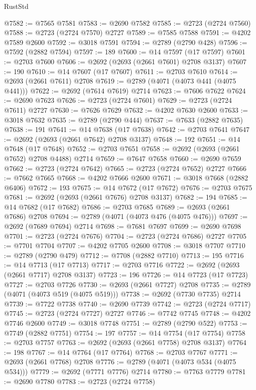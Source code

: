 \begin{lexlean}{RustStd}
\begin{coremodule}
@7582 := @7565 @7581
@7583 := @2690 @7582
@7585 := @2723 (@2724 @7560)
@7588 := @2723 (@2724 @7570) @2727
@7589 := @7585 @7588
@7591 := @4202 @7589 @2600
@7592 := @3018 @7591
@7594 := @2789 (@2790 @428)
@7596 := @7592 (@2882 @7594)
@7597 := 189
@7600 := @14 @7597 (@17 @7597)
@7601 := @2703 @7600
@7606 := @2692 (@2693 (@2661 @7601) @2708 @3137)
@7607 := 190
@7610 := @14 @7607 (@17 @7607)
@7611 := @2703 @7610
@7614 := @2693 (@2661 @7611) @2708
@7619 := @2789 (@4071 (@4073 @441 (@4075 @441)))
@7622 := @2692 (@7614 @7619) @2714
@7623 := @7606 @7622
@7624 := @2690 @7623
@7626 := @2723 (@2724 @7601)
@7629 := @2723 (@2724 @7611) @2727
@7630 := @7626 @7629
@7632 := @4202 @7630 @2600
@7633 := @3018 @7632
@7635 := @2789 (@2790 @444)
@7637 := @7633 (@2882 @7635)
@7638 := 191
@7641 := @14 @7638 (@17 @7638)
@7642 := @2703 @7641
@7647 := @2692 (@2693 (@2661 @7642) @2708 @3137)
@7648 := 192
@7651 := @14 @7648 (@17 @7648)
@7652 := @2703 @7651
@7658 := @2692 (@2693 (@2661 @7652) @2708 @4488) @2714
@7659 := @7647 @7658
@7660 := @2690 @7659
@7662 := @2723 (@2724 @7642)
@7665 := @2723 (@2724 @7652) @2727
@7666 := @7662 @7665
@7668 := @4202 @7666 @2600
@7671 := @3018 @7668 (@2882 @6406)
@7672 := 193
@7675 := @14 @7672 (@17 @7672)
@7676 := @2703 @7675
@7681 := @2692 (@2693 (@2661 @7676) @2708 @3137)
@7682 := 194
@7685 := @14 @7682 (@17 @7682)
@7686 := @2703 @7685
@7689 := @2693 (@2661 @7686) @2708
@7694 := @2789 (@4071 (@4073 @476 (@4075 @476)))
@7697 := @2692 (@7689 @7694) @2714
@7698 := @7681 @7697
@7699 := @2690 @7698
@7701 := @2723 (@2724 @7676)
@7704 := @2723 (@2724 @7686) @2727
@7705 := @7701 @7704
@7707 := @4202 @7705 @2600
@7708 := @3018 @7707
@7710 := @2789 (@2790 @479)
@7712 := @7708 (@2882 @7710)
@7713 := 195
@7716 := @14 @7713 (@17 @7713)
@7717 := @2703 @7716
@7722 := @2692 (@2693 (@2661 @7717) @2708 @3137)
@7723 := 196
@7726 := @14 @7723 (@17 @7723)
@7727 := @2703 @7726
@7730 := @2693 (@2661 @7727) @2708
@7735 := @2789 (@4071 (@4073 @519 (@4075 @519)))
@7738 := @2692 (@7730 @7735) @2714
@7739 := @7722 @7738
@7740 := @2690 @7739
@7742 := @2723 (@2724 @7717)
@7745 := @2723 (@2724 @7727) @2727
@7746 := @7742 @7745
@7748 := @4202 @7746 @2600
@7749 := @3018 @7748
@7751 := @2789 (@2790 @522)
@7753 := @7749 (@2882 @7751)
@7754 := 197
@7757 := @14 @7754 (@17 @7754)
@7758 := @2703 @7757
@7763 := @2692 (@2693 (@2661 @7758) @2708 @3137)
@7764 := 198
@7767 := @14 @7764 (@17 @7764)
@7768 := @2703 @7767
@7771 := @2693 (@2661 @7768) @2708
@7776 := @2789 (@4071 (@4073 @534 (@4075 @534)))
@7779 := @2692 (@7771 @7776) @2714
@7780 := @7763 @7779
@7781 := @2690 @7780
@7783 := @2723 (@2724 @7758)

\end{coremodule}
\end{lexlean}
